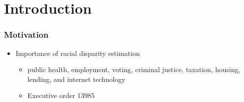 \documentclass[handout]{beamer}
\title[Algorithm-Assisted Human Decision]{\tit}
\institute[Harvard]{\large Harvard University }
\date{Department of Political Science, University of Michigan\\
  March 10, 2023 \\  \vspace{.25in} Joint work with
  Cory McCartan, Jacob Goldin, and Daniel E. Ho }
\author[Kosuke Imai]{\large Kosuke Imai }
\begin{document}
\frame{\titlepage}



\section{Introduction}

\begin{frame}

  \frametitle{Motivation}

  \begin{itemize}
  \item Importance of racial disparity estimation
    \begin{itemize}
    \item public health, employment, voting, criminal justice,
      taxation, housing, lending, and internet technology
      \item Executive order 13985
    \end{itemize}


  \end{itemize}

\end{frame}
\end{document}
